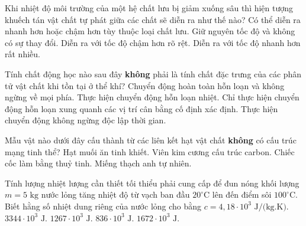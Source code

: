 \begin{ex}	Khi nhiệt độ môi trường của một hệ chất lưu bị giảm xuống sâu thì hiện tượng khuếch tán vật chất tự phát giữa các chất sẽ diễn ra như thế nào?
	\choice
	{Có thể diễn ra nhanh hơn hoặc chậm hơn tùy thuộc loại chất lưu.}
	{Giữ nguyên tốc độ và không có sự thay đổi.}
	{\True Diễn ra với tốc độ chậm hơn rõ rệt.}
	{Diễn ra với tốc độ nhanh hơn rất nhiều.}
\end{ex}

\begin{ex}	Tính chất động học nào sau đây \textbf{không} phải là tính chất đặc trưng của các phân tử vật chất khi tồn tại ở thể khí?
	\choice
	{Chuyển động hoàn toàn hỗn loạn và không ngừng về mọi phía.}
	{Thực hiện chuyển động hỗn loạn nhiệt.}
	{\True Chỉ thực hiện chuyển động hỗn loạn xung quanh các vị trí cân bằng cố định xác định.}
	{Thực hiện chuyển động không ngừng độc lập thời gian.}
\end{ex}

\begin{ex}	Mẫu vật nào dưới đây cấu thành từ các liên kết hạt vật chất \textbf{không} có cấu trúc mạng tinh thể?
	\choice
	{Hạt muối ăn tinh khiết.}
	{Viên kim cương cấu trúc carbon.}
	{\True Chiếc cốc làm bằng thuỷ tinh.}
	{Miếng thạch anh tự nhiên.}
\end{ex}

\begin{ex}	Tính lượng nhiệt lượng cần thiết tối thiểu phải cung cấp để đun nóng khối lượng $m = 5\text{ kg}$ nước lỏng tăng nhiệt độ từ vạch ban đầu $20^\circ\text{C}$ lên đến điểm sôi $100^\circ\text{C}$. Biết hằng số nhiệt dung riêng của nước lỏng cho bằng $c = 4,18 \cdot 10^{3}\text{ J/(kg.K)}$.
	\choice
	{$3344 \cdot 10^{3}\text{ J}$.}
	{$1267 \cdot 10^{3}\text{ J}$.}
	{$836 \cdot 10^{3}\text{ J}$.}
	{\True $1672 \cdot 10^{3}\text{ J}$.}
\end{ex}

